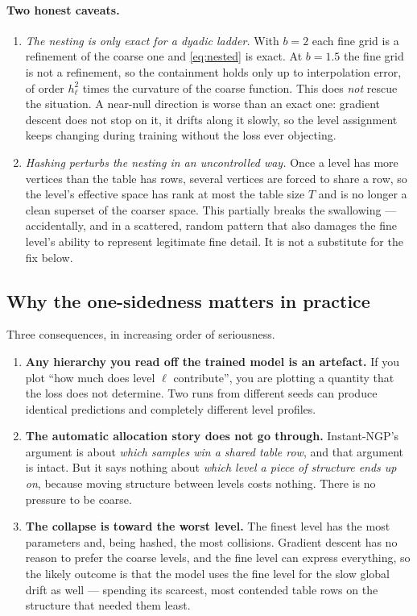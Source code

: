 \documentclass[11pt,a4paper]{article}
\begin{document}
\paragraph{Two honest caveats.}
\begin{enumerate}[leftmargin=1.4em,itemsep=2pt]
\item \emph{The nesting is only exact for a dyadic ladder.} With $b=2$ each fine grid is a
refinement of the coarse one and \eqref{eq:nested} is exact. At $b=1.5$ the fine grid is
not a refinement, so the containment holds only up to interpolation error, of order
$h_\ell^2$ times the curvature of the coarse function. This does \emph{not} rescue the
situation. A near-null direction is worse than an exact one: gradient descent does not stop
on it, it drifts along it slowly, so the level assignment keeps changing during training
without the loss ever objecting.
\item \emph{Hashing perturbs the nesting in an uncontrolled way.} Once a level has more
vertices than the table has rows, several vertices are forced to share a row, so the
level's effective space has rank at most the table size $T$ and is no longer a clean
superset of the coarser space. This partially breaks the swallowing --- accidentally, and
in a scattered, random pattern that also damages the fine level's ability to represent
legitimate fine detail. It is not a substitute for the fix below.
\end{enumerate}

\subsection{Why the one-sidedness matters in practice}

Three consequences, in increasing order of seriousness.

\begin{enumerate}[leftmargin=1.4em,itemsep=3pt]
\item \textbf{Any hierarchy you read off the trained model is an artefact.} If you plot
``how much does level $\ell$ contribute'', you are plotting a quantity that the loss does
not determine. Two runs from different seeds can produce identical predictions and
completely different level profiles.

\item \textbf{The automatic allocation story does not go through.} Instant-NGP's argument
is about \emph{which samples win a shared table row}, and that argument is intact. But it
says nothing about \emph{which level a piece of structure ends up on}, because moving
structure between levels costs nothing. There is no pressure to be coarse.

\item \textbf{The collapse is toward the worst level.} The finest level has the most
parameters and, being hashed, the most collisions. Gradient descent has no reason to prefer
the coarse levels, and the fine level can express everything, so the likely outcome is that
the model uses the fine level for the slow global drift as well --- spending its scarcest,
most contended table rows on the structure that needed them least.
\end{enumerate}
\end{document}

